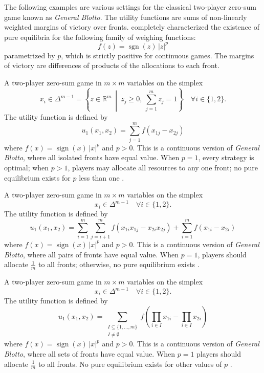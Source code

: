

The following examples are various settings for the classical two-player zero-sum game known as \emph{General Blotto}. The utility functions are sums of non-linearly weighted margins of victory over fronts.  \textcite{Golman2009} completely characterized the existence of pure equilibria for the following family of weighing functions:
\[
f(z) = \operatorname{sgn}(z)\,|z|^p
\]
parametrized by $p$, which is strictly positive for continuous games. The margins of victory are differences of products of the allocations to each front.

\begin{game}\label{ex.golman09.isolated}
A two-player zero-sum game in $m \times m$ variables on the simplex
\[
x_i \in \Delta^{m-1} = \left\{ z \in \mathbb{R}^m \ \middle|\ z_j \ge 0,\ \sum_{j=1}^m z_j = 1 \right\} \quad \forall i \in \{1,2\}.
\]
The utility function is defined by
\[
u_1(x_1, x_2) = \sum_{j=1}^m f\left( x_{1j} - x_{2j} \right)
\]
where $f(x) = \operatorname{sign}(x)\,|x|^p$ and $p>0$. This is a continuous version of \emph{General Blotto}, where all isolated fronts have equal value. When $p = 1$, every strategy is optimal; when $p>1$, players may allocate all resources to any one front; no pure equilibrium exists for $p$ less than one \cite{Golman2009}.
\end{game}

\begin{game}\label{ex.golman09.pairs}
A two-player zero-sum game in $m \times m$ variables on the simplex
\[
x_i \in \Delta^{m-1} \quad \forall i \in \{1,2\}.
\]
The utility function is defined by
\[
u_1(x_1, x_2) = \sum_{i=1}^m\sum_{j=i+1}^m f\left( x_{1i}x_{1j} - x_{2i}x_{2j} \right) + \sum_{i=1}^m f\left( x_{1i} - x_{2i} \right)
\]
where $f(x) = \operatorname{sign}(x)\,|x|^p$ and $p>0$. This is a continuous version of \emph{General Blotto}, where all pairs of fronts have equal value. When $p = 1$, players should allocate $\frac{1}{m}$ to all fronts; otherwise, no pure equilibrium exists \cite{Golman2009}.
\end{game}

\begin{game}\label{ex.golman09.sets}
A two-player zero-sum game in $m \times m$ variables on the simplex
\[
x_i \in \Delta^{m-1} \quad \forall i \in \{1,2\}.
\]
The utility function is defined by
\[
u_1(x_1, x_2) = \sum_{\substack{I \subseteq \{1, \dots, m\} \\ I \ne \emptyset}} f\left( \prod_{i \in I} x_{1i} - \prod_{i \in I} x_{2i} \right)
\]
where $f(x) = \operatorname{sign}(x)\,|x|^p$ and $p>0$. This is a continuous version of \emph{General Blotto}, where all sets of fronts have equal value. When $p = 1$ players should allocate $\frac{1}{m}$ to all fronts. No pure equilibrium exists for other values of $p$ \cite{Golman2009}.
\end{game}